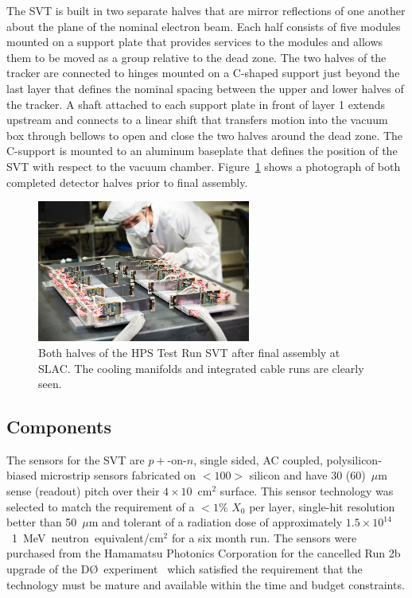 \documentclass[final,3p,times,twocolumn]{elsarticle}
\newcommand{\fluenceunit}{1~MeV~neutron~equivalent/cm\ensuremath{^2}}
\begin{document}
The SVT is built in two separate halves that are mirror reflections of one another about the plane of 
the nominal electron beam.  Each half consists of five modules mounted on a support plate that 
provides services to the modules and allows them to be moved as a group relative to the dead zone. 
The two halves of the tracker are connected to hinges mounted on a C-shaped support just beyond 
the last layer that defines the nominal spacing between the upper and lower halves of the tracker.  A 
shaft attached to each support plate in front of layer 1 extends upstream and connects to a linear shift 
that transfers motion into the vacuum box through bellows to open and close the two halves around 
the dead zone. The C-support is mounted to an aluminum baseplate that defines the position of the 
SVT with respect to the vacuum chamber. Figure~\ref{fig:tracker_halves} shows a photograph of both 
completed detector halves prior to final assembly. 
\begin{figure}[htp]
\begin{center}
    \includegraphics[width=7cm]{figures/2012-101-PHOTON-DETECTOR-001}
\caption{\small{Both halves of the HPS Test Run SVT after final assembly at SLAC.  The cooling manifolds and 
integrated cable runs are clearly seen.} }
\label{fig:tracker_halves}
\end{center}
\end{figure}

\subsection{Components}
The sensors for the SVT are $p+$-on-$n$, single sided, AC coupled, polysilicon-biased microstrip 
sensors fabricated on $<100>$ silicon and have 30 (60)~$\mu$m sense (readout) pitch over their 
$4\times10$~cm$^2$ surface. This sensor technology was selected to match the requirement of 
a $<1$\% $X_0$ per layer, single-hit resolution better than 50~$\mu$m and tolerant of a radiation 
dose of approximately $1.5\times10^{14}$~\fluenceunit{} for a six month run. The sensors 
were purchased from the Hamamatsu Photonics Corporation for the cancelled 
Run 2b upgrade of the D\O~experiment~\cite{Denisov:2001aa} which satisfied the requirement that 
the technology must be mature and available within the time and budget constraints.
\end{document}

